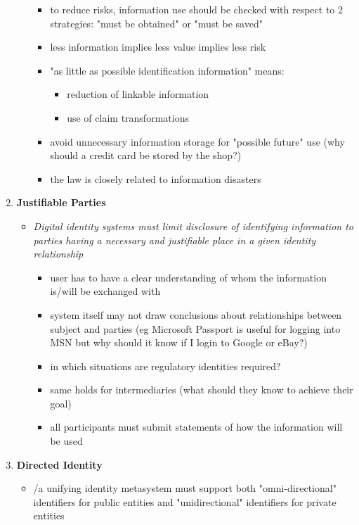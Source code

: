 \documentclass[11pt]{article}
\begin{document}
\begin{enumerate}
\begin{itemize}
\begin{itemize}
\item to reduce risks, information use should be checked with respect to 2 strategies: "must be obtained" or "must be saved"
\item less information implies less value implies less risk
\item "as little as possible identification information" means:
\begin{itemize}
\item reduction of linkable information
\item use of claim transformations
\end{itemize}
\item avoid unnecessary information storage for "possible future" use (why should a credit card be stored by the shop?)
\item the law is closely related to information disasters
\end{itemize}
\end{itemize}
\item \textbf{Justifiable Parties}
\begin{itemize}
\item \emph{Digital identity systems must limit disclosure of identifying information to parties having a necessary and justifiable place in a given identity relationship}
\begin{itemize}
\item user has to have a clear understanding of whom the information is/will be exchanged with
\item system itself may not draw conclusions about relationships between subject and parties (eg Microsoft Passport is useful for logging into MSN but why should it know if I login to Google or eBay?)
\item in which situations are regulatory identities required?
\item same holds for intermediaries (what should they know to achieve their goal)
\item all participants must submit statements of how the information will be used
\end{itemize}
\end{itemize}
\item \textbf{Directed Identity}
\begin{itemize}
\item /a unifying identity metasystem must support both "omni-directional" identifiers for public entities and "unidirectional" identifiers for private entities
\begin{itemize}

\end{itemize}
\end{itemize}
\end{enumerate}
\end{document}
